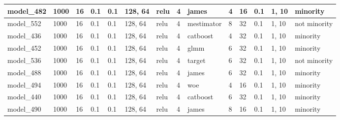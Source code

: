 \begin{tabular}{|l|l|l|l|l|l|l|l|l|l|l|l|l|l|}
model\_482     & 1000           & 16           & 0.1          & 0.1          & 128, 64     & relu         & 4           & james             & 4                    & 16                    & 0.1                        & 1, 10            & minority                    \\ \hline
model\_552     & 1000           & 16           & 0.1          & 0.1          & 128, 64     & relu         & 4           & mestimator        & 8                    & 32                    & 0.1                        & 1, 10            & not minority                \\ \hline
model\_436     & 1000           & 16           & 0.1          & 0.1          & 128, 64     & relu         & 4           & catboost          & 4                    & 32                    & 0.1                        & 1, 10            & minority                    \\ \hline
model\_452     & 1000           & 16           & 0.1          & 0.1          & 128, 64     & relu         & 4           & glmm              & 6                    & 32                    & 0.1                        & 1, 10            & minority                    \\ \hline
model\_536     & 1000           & 16           & 0.1          & 0.1          & 128, 64     & relu         & 4           & target            & 6                    & 32                    & 0.1                        & 1, 10            & not minority                \\ \hline
model\_488     & 1000           & 16           & 0.1          & 0.1          & 128, 64     & relu         & 4           & james             & 6                    & 32                    & 0.1                        & 1, 10            & minority                    \\ \hline
model\_494     & 1000           & 16           & 0.1          & 0.1          & 128, 64     & relu         & 4           & woe               & 4                    & 16                    & 0.1                        & 1, 10            & minority                    \\ \hline
model\_440     & 1000           & 16           & 0.1          & 0.1          & 128, 64     & relu         & 4           & catboost          & 6                    & 32                    & 0.1                        & 1, 10            & minority                    \\ \hline
model\_490     & 1000           & 16           & 0.1          & 0.1          & 128, 64     & relu         & 4           & james             & 8                    & 16                    & 0.1                        & 1, 10            & minority                    \\ \hline

\end{tabular}
